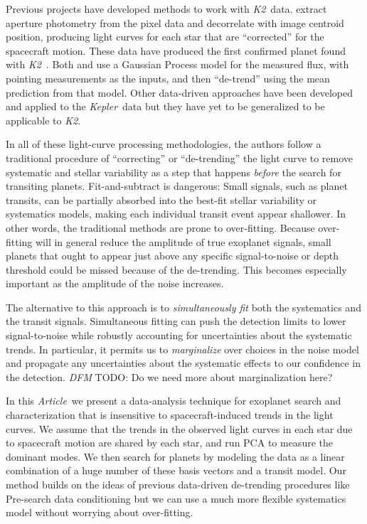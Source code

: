\documentclass[12pt,preprint]{aastex}
\newcommand{\project}[1]{\textsl{#1}} %
\newcommand{\kepler}{\project{Kepler}}
\newcommand{\KT}{\project{K2}}
\newcommand{\pdc}{\project{PDC}}
\newcommand{\paper}{\textsl{Article}}
\newcommand{\todo}[3]{{\color{#2} \emph{#1} TODO: #3}}
\newcommand{\dfmtodo}[1]{\todo{DFM}{red}{#1}}
\begin{document}
Previous projects have developed methods to work with \KT\ data.
\citet{Vanderburg:2014} extract aperture photometry from the pixel data
and decorrelate with image centroid position, producing light curves for each
star that are ``corrected'' for the spacecraft motion.
These data have produced the first confirmed planet found with
\KT\ \citep{Vanderburg:2015}.
Both \citet{Aigrain:2015} and \citet{Crossfield:2015} use a Gaussian Process
model for the measured flux, with pointing measurements as the inputs, and
then ``de-trend'' using the mean prediction from that model.
Other data-driven approaches have been developed and applied to the \kepler\
data \citep[for example,][]{pdc1, pdc2, arc, dun} but they have yet to be
generalized to be applicable to \KT.

In all of these light-curve processing methodologies, the authors follow a
traditional procedure of ``correcting'' or ``de-trending'' the light curve to
remove systematic and stellar variability as a step that happens \emph{before}
the search for transiting planets.
Fit-and-subtract is dangerous:
Small signals, such as planet transits, can be
partially absorbed into the best-fit stellar variability or systematics
models, making each individual transit event appear shallower.
In other words, the traditional methods are prone to over-fitting.
Because over-fitting will in general reduce the amplitude of true exoplanet
signals, small planets that ought to appear just above any specific
signal-to-noise or depth threshold could be missed because of the de-trending.
This becomes especially important as the amplitude of the noise increases.

The alternative to this approach is to \emph{simultaneously fit} both the systematics
and the transit signals.
Simultaneous fitting can push the detection limits to lower signal-to-noise while
robustly accounting for uncertainties about the systematic trends.
In particular, it permits us to \emph{marginalize} over choices in the noise
model and propagate any uncertainties about the systematic effects
to our confidence in the detection.
\dfmtodo{Do we need more about marginalization here?}

In this \paper\ we present a data-analysis technique for exoplanet search and
characterization that is insensitive to spacecraft-induced trends in the light
curves.
We assume that the trends in the observed light curves in each star due to
spacecraft motion are shared by each star, and run PCA to measure the dominant
modes.
We then search for planets by modeling the data as a linear combination of a
huge number of these basis vectors and a transit model.
Our method builds on the ideas of previous data-driven de-trending procedures
like Pre-search data conditioning \citep[\pdc;][]{pdc1, pdc2} but we can use a
much more flexible systematics model without worrying about over-fitting.
\end{document}
